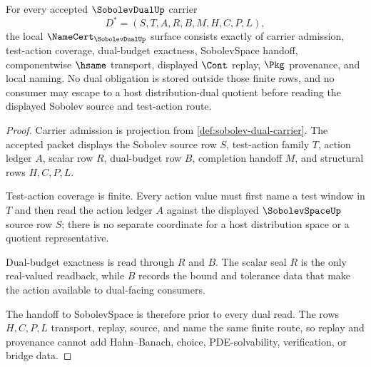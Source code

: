 \begin{theorem}
\label{thm:sobolev-dual-obligation-surface}
For every accepted $\SobolevDualUp$ carrier
$$
D^\ast=(S,T,A,R,B,M,H,C,P,L),
$$
the local $\NameCert_{\SobolevDualUp}$ surface consists exactly of carrier admission, test-action coverage, dual-budget exactness, SobolevSpace handoff, componentwise $\hsame$ transport, displayed $\Cont$ replay, $\Pkg$ provenance, and local naming. No dual obligation is stored outside those finite rows, and no consumer may escape to a host distribution-dual quotient before reading the displayed Sobolev source and test-action route.
\end{theorem}
\begin{proof}
Carrier admission is projection from \autoref{def:sobolev-dual-carrier}. The accepted packet displays the Sobolev source row $S$, test-action family $T$, action ledger $A$, scalar row $R$, dual-budget row $B$, completion handoff $M$, and structural rows $H,C,P,L$.

Test-action coverage is finite. Every action value must first name a test window in $T$ and then read the action ledger $A$ against the displayed $\SobolevSpaceUp$ source row $S$; there is no separate coordinate for a host distribution space or a quotient representative.

Dual-budget exactness is read through $R$ and $B$. The scalar seal $R$ is the only real-valued readback, while $B$ records the bound and tolerance data that make the action available to dual-facing consumers.

The handoff to SobolevSpace is therefore prior to every dual read. The rows $H,C,P,L$ transport, replay, source, and name the same finite route, so replay and provenance cannot add Hahn--Banach, choice, PDE-solvability, verification, or bridge data.
\end{proof}



